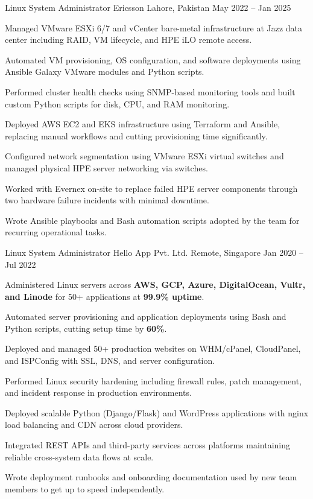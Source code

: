 \documentclass[11pt, a4paper]{awesome-cv}
\begin{document}
\begin{cventries}

  \cventry
    {Linux System Administrator}
    {Ericsson}
    {Lahore, Pakistan}
    {May 2022 -- Jan 2025}
    {
      \begin{cvitems}
        \item {Managed VMware ESXi 6/7 and vCenter bare-metal infrastructure at Jazz data center including RAID, VM lifecycle, and HPE iLO remote access.}
        \item {Automated VM provisioning, OS configuration, and software deployments using Ansible Galaxy VMware modules and Python scripts.}
        \item {Performed cluster health checks using SNMP-based monitoring tools and built custom Python scripts for disk, CPU, and RAM monitoring.}
        \item {Deployed AWS EC2 and EKS infrastructure using Terraform and Ansible, replacing manual workflows and cutting provisioning time significantly.}
        \item {Configured network segmentation using VMware ESXi virtual switches and managed physical HPE server networking via switches.}
        \item {Worked with Evernex on-site to replace failed HPE server components through two hardware failure incidents with minimal downtime.}
        \item {Wrote Ansible playbooks and Bash automation scripts adopted by the team for recurring operational tasks.}
      \end{cvitems}
    }

  \cventry
    {Linux System Administrator}
    {Hello App Pvt. Ltd.}
    {Remote, Singapore}
    {Jan 2020 -- Jul 2022}
    {
      \begin{cvitems}
        \item {Administered Linux servers across \textbf{AWS, GCP, Azure, DigitalOcean, Vultr, and Linode} for 50+ applications at \textbf{99.9\% uptime}.}
        \item {Automated server provisioning and application deployments using Bash and Python scripts, cutting setup time by \textbf{60\%}.}
        \item {Deployed and managed 50+ production websites on WHM/cPanel, CloudPanel, and ISPConfig with SSL, DNS, and server configuration.}
        \item {Performed Linux security hardening including firewall rules, patch management, and incident response in production environments.}
        \item {Deployed scalable Python (Django/Flask) and WordPress applications with nginx load balancing and CDN across cloud providers.}
        \item {Integrated REST APIs and third-party services across platforms maintaining reliable cross-system data flows at scale.}
        \item {Wrote deployment runbooks and onboarding documentation used by new team members to get up to speed independently.}
      \end{cvitems}
    }


\end{cventries}
\end{document}
